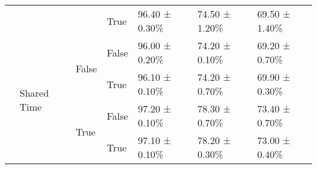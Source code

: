 \begin{tabular}{lllllll}
 &  &  & True & 96.40 ± 0.30\% & 74.50 ± 1.20\% & 69.50 ± 1.40\% \\
\cline{2-7} \cline{3-7}
 & \multirow[t]{4}{*}{Shared Time} & \multirow[t]{2}{*}{False} & False & 96.00 ± 0.20\% & 74.20 ± 0.10\% & 69.20 ± 0.70\% \\
 &  &  & True & 96.10 ± 0.10\% & 74.20 ± 0.70\% & 69.90 ± 0.30\% \\
\cline{3-7}
 &  & \multirow[t]{2}{*}{True} & False & 97.20 ± 0.10\% & 78.30 ± 0.70\% & 73.40 ± 0.70\% \\
 &  &  & True & 97.10 ± 0.10\% & 78.20 ± 0.30\% & 73.00 ± 0.40\% \\
\cline{1-7} \cline{2-7} \cline{3-7}
\bottomrule
\end{tabular}
